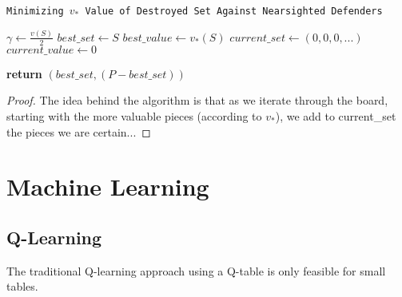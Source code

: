 \documentclass{article}
\theoremstyle{plain}
\theoremstyle{definition}
\theoremstyle{remark}
\begin{document}
\begin{center}
  \begin{minipage}{1\linewidth} %
    \begin{algorithm}[H]

      \caption{\texttt{Minimizing $v_{*}$ Value of Destroyed Set Against Nearsighted Defenders}} %
      \label{alg:nearsighted}   %


      \medskip
      $\gamma \leftarrow \frac{v(S)}{2}$\;
      $best\_set \leftarrow S$ \;
      $best\_value \leftarrow v_{*}(S)$ \;
      $current\_set \leftarrow (0, 0, 0, ...)$ \;
      $current\_value \leftarrow 0$ \;

       {
         {
        }
      }

      {\bf return} $(best\_set, (P - best\_set))$ \;
    \end{algorithm}
  \end{minipage}
\end{center}

\begin{proof}
The idea behind the algorithm is that as we iterate through the board, starting with the more valuable pieces (according to $v_{*}$), we add to current\_set the pieces we are certain...


\end{proof}


\section{Machine Learning}
\subsection{Q-Learning}
The traditional Q-learning approach using a Q-table is only feasible for small tables.
\end{document}
